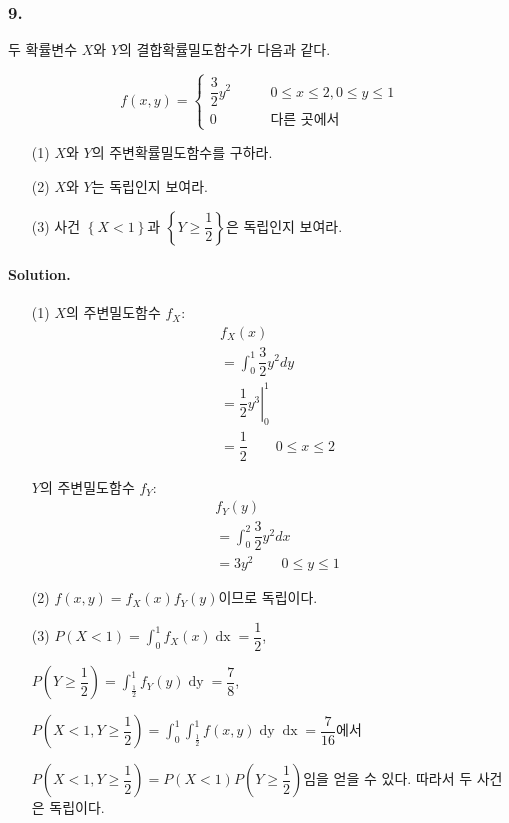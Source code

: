 \subsubsection{9.} 두 확률변수 $X$와 $Y$의 결합확률밀도함수가 다음과 같다. 

\[f\left(x, y\right) = \left\{
\begin{array}{ll}
	\dfrac{3}{2}y^2 & \qquad 0\leq x\leq 2, 0\leq y\leq 1 \\
	0 & \qquad\textrm{다른 곳에서}
\end{array}
\right. \]

\begin{itemize}
  \item [(1)] $X$와 $Y$의 주변확률밀도함수를 구하라.
  \item [(2)] $X$와 $Y$는 독립인지 보여라.
  \item [(3)] 사건 $\left\{X<1\right\}$과 $\left\{Y\geq \dfrac{1}{2}\right\}$은 독립인지 보여라.
\end{itemize}

\paragraph{Solution.} 
\begin{itemize}
  \item [(1)] $X$의 주변밀도함수 $f_X$:
\begin{align*}
	& f_X\left(x\right) \\
	&= \int_0^1 \dfrac{3}{2}y^2 dy \\
	&= \left.\dfrac{1}{2}y^3\right|_0^1 \\
	&= \dfrac{1}{2} \qquad 0\leq x\leq 2
\end{align*}

$Y$의 주변밀도함수 $f_Y$:
\begin{align*}
	& f_Y\left(y\right) \\
	&= \int_0^2 \dfrac{3}{2}y^2 dx \\
	&= 3y^2 \qquad 0\leq y\leq 1
\end{align*}

  \item [(2)] $f\left(x, y\right) = f_X\left(x\right)f_Y\left(y\right)$이므로 독립이다.
  \item [(3)] $\displaystyle P\left(X<1\right) = \int_0^1 f_X\left(x\right) \mathop{dx} = \dfrac{1}{2}$,
 
  $\displaystyle P\left(Y\geq \dfrac{1}{2}\right) = \int_\frac{1}{2}^1 f_Y\left(y\right) \mathop{dy} = \dfrac{7}{8}$,
  
  $\displaystyle P\left(X<1, Y\geq \dfrac{1}{2}\right) = \int_0^1\int_\frac{1}{2}^1 f\left(x, y\right) \mathop{dy} \mathop{dx} = \dfrac{7}{16}$에서
  
  $P\left(X<1, Y\geq \dfrac{1}{2}\right) = P\left(X<1\right)P\left(Y\geq \dfrac{1}{2}\right)$임을 얻을 수 있다. 따라서 두 사건은 독립이다.
\end{itemize}

